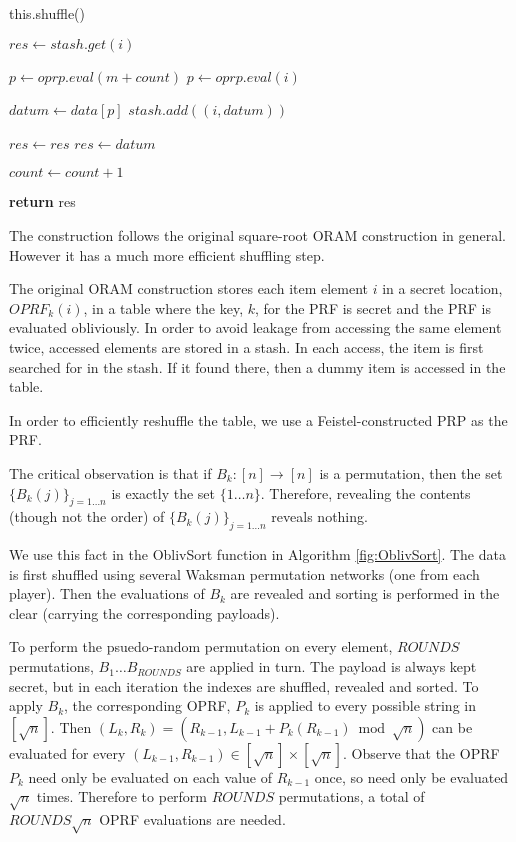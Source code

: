 \begin{algorithm}
\begin{algorithmic}[1]


    \State this.shuffle()
\EndIf

\State $res \gets stash.get(i)$

    \State $p \gets oprp.eval(m + count)$
\Else
    \State $p \gets oprp.eval(i)$
\EndIf

\State $datum \gets data[p]$
\State $stash.add((i, datum))$

    \State $res \gets res$
\Else
    \State $res \gets datum$
\EndIf

\State $count \gets count + 1$ 

\State \textbf{return} res
\EndProcedure

\end{algorithmic}
\end{algorithm}


The construction follows the original square-root ORAM construction
\cite{ostrovsky1997private} in general. 
However it has a much more efficient shuffling step.

The original ORAM construction stores each item element $i$
in a secret location, $OPRF_k(i)$, in a table where
the key, $k$, for the PRF is secret and the PRF is evaluated obliviously.
In order to avoid leakage from accessing the same element twice,
accessed elements are stored in a stash. 
In each access, the item is first searched for in the stash.
If it found there, then a dummy item is accessed in the table.

In order to efficiently reshuffle the table, we use a Feistel-constructed
PRP as the PRF.

The critical observation is that if $B_k : [n] \rightarrow [n]$ is a permutation, 
then the set $\{B_k(j) \}_{j=1 \ldots n}$ is exactly the set $\{1 \ldots n\}$.
Therefore, revealing the contents (though not the order) of
$\{B_k(j)\}_{j=1 \ldots n}$ reveals nothing.

We use this fact in the OblivSort function in Algorithm \ref{fig:OblivSort}.
The data is first shuffled using several Waksman permutation networks
(one from each player).
Then the evaluations of $B_k$ are revealed and sorting is performed in the clear
(carrying the corresponding payloads).

To perform the psuedo-random permutation on every element, 
$ROUNDS$ permutations, $B_1 \ldots B_{ROUNDS}$ are applied in turn.
The payload is always kept secret, 
but in each iteration the indexes are shuffled, revealed and sorted.
To apply $B_k$, the corresponding OPRF, $P_k$ is applied to every possible string
in $[\sqrt{n}]$. 
Then $(L_k, R_k) = (R_{k-1}, L_{k-1} + P_k(R_{k-1}) \bmod \sqrt{n})$ can 
be evaluated for every $(L_{k-1}, R_{k-1}) \in [\sqrt{n}] \times [\sqrt{n}]$.
Observe that the OPRF $P_k$ need only be evaluated on each value of
$R_{k-1}$ once, so need only be evaluated $\sqrt{n}$ times.
Therefore to perform $ROUNDS$ permutations, a total of $ROUNDS \sqrt{n}$ OPRF
evaluations are needed.




